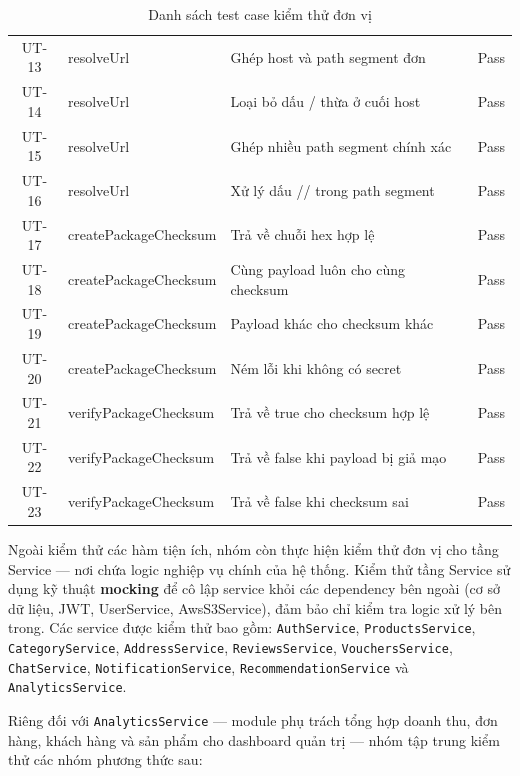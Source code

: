 \begin{table}[H]
\begin{tabular}{|c|l|p{6.5cm}|c|}
    \hline
    UT-13          & resolveUrl            & Ghép host và path segment đơn                & Pass             \\
    UT-14          & resolveUrl            & Loại bỏ dấu / thừa ở cuối host               & Pass             \\
    UT-15          & resolveUrl            & Ghép nhiều path segment chính xác            & Pass             \\
    UT-16          & resolveUrl            & Xử lý dấu // trong path segment              & Pass             \\
    \hline
    UT-17          & createPackageChecksum & Trả về chuỗi hex hợp lệ                      & Pass             \\
    UT-18          & createPackageChecksum & Cùng payload luôn cho cùng checksum          & Pass             \\
    UT-19          & createPackageChecksum & Payload khác cho checksum khác               & Pass             \\
    UT-20          & createPackageChecksum & Ném lỗi khi không có secret                  & Pass             \\
    \hline
    UT-21          & verifyPackageChecksum & Trả về true cho checksum hợp lệ              & Pass             \\
    UT-22          & verifyPackageChecksum & Trả về false khi payload bị giả mạo          & Pass             \\
    UT-23          & verifyPackageChecksum & Trả về false khi checksum sai                & Pass             \\
    \hline
  \end{tabular}
  \caption{Danh sách test case kiểm thử đơn vị}
\end{table}

Ngoài kiểm thử các hàm tiện ích, nhóm còn thực hiện kiểm thử đơn vị cho tầng Service — nơi chứa logic nghiệp vụ chính của hệ thống. Kiểm thử tầng Service sử dụng kỹ thuật \textbf{mocking} để cô lập service khỏi các dependency bên ngoài (cơ sở dữ liệu, JWT, UserService, AwsS3Service), đảm bảo chỉ kiểm tra logic xử lý bên trong. Các service được kiểm thử bao gồm: \texttt{AuthService}, \texttt{ProductsService}, \texttt{CategoryService}, \texttt{AddressService}, \texttt{ReviewsService}, \texttt{VouchersService}, \texttt{ChatService}, \texttt{NotificationService}, \texttt{RecommendationService} và \texttt{AnalyticsService}.

Riêng đối với \texttt{AnalyticsService} — module phụ trách tổng hợp doanh thu, đơn hàng, khách hàng và sản phẩm cho dashboard quản trị — nhóm tập trung kiểm thử các nhóm phương thức sau:

